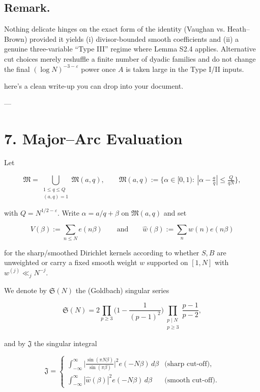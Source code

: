 \documentclass[11pt]{article}
\theoremstyle{definition}
\theoremstyle{remark}
\begin{document}
\subsection*{Remark.}

Nothing delicate hinges on the exact form of the identity (Vaughan vs. Heath–Brown) provided it yields (i) divisor-bounded smooth coefficients and (ii) a genuine three-variable “Type III” regime where Lemma S2.4 applies. Alternative cut choices merely reshuffle a finite number of dyadic families and do not change the final $(\log N)^{-3-\varepsilon}$ power once $A$ is taken large in the Type I/II inputs.

here’s a clean write-up you can drop into your document.

---

\section*{7. Major–Arc Evaluation}

Let

$$
\mathfrak M=\bigcup_{\substack{1\le q\le Q\\(a,q)=1}}\mathfrak M(a,q),\qquad 
\mathfrak M(a,q):=\{\alpha\in[0,1):\ |\alpha-\tfrac aq|\le \tfrac{Q}{qN}\},
$$

with $Q=N^{1/2-\varepsilon}$. Write $\alpha=a/q+\beta$ on $\mathfrak M(a,q)$ and set

$$
V(\beta):=\sum_{n\le N}e(n\beta) \qquad\text{and}\qquad \widehat w(\beta):=\sum_{n}w(n)e(n\beta)
$$

for the sharp/smoothed Dirichlet kernels according to whether $S, B$ are unweighted or carry a fixed smooth weight $w$ supported on $[1,N]$ with $w^{(j)}\ll_j N^{-j}$.

We denote by $\mathfrak S(N)$ the (Goldbach) singular series

$$
\mathfrak S(N)=2\prod_{p\ge 3}\Big(1-\frac1{(p-1)^2}\Big)
\prod_{\substack{p\mid N\\ p\ge 3}}\frac{p-1}{p-2},
$$

and by $\mathfrak J$ the singular integral

$$
\mathfrak J=
\begin{cases}
\displaystyle \int_{-\infty}^{\infty}\Big|\frac{\sin(\pi N\beta)}{\sin(\pi\beta)}\Big|^{\!2}e(-N\beta)\,d\beta
&\text{(sharp cut-off)},\\[2ex]
\displaystyle \int_{-\infty}^{\infty}|\widehat w(\beta)|^{2}e(-N\beta)\,d\beta
&\text{(smooth cut-off)}.
\end{cases}
$$
\end{document}
